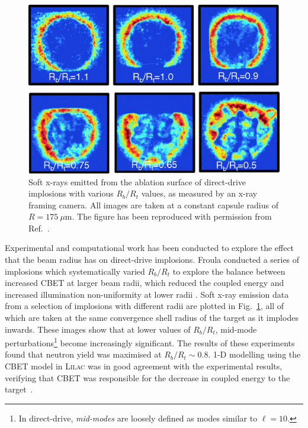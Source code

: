 \begin{figure}[t!]
    \includegraphics[width=0.5\linewidth]{Results1/Images/RbRt_froula.png}
    \centering
    \caption{Soft x-rays emitted from the ablation surface of direct-drive implosions with various $R_b/R_t$ values, as measured by an x-ray framing camera.
    All images are taken at a constant capsule radius of $R=175\ \mu\text{m}$.
    The figure has been reproduced with permission from Ref.~\cite{froula_increasing_2012}.}%
    \label{fig:RbRt_froula}
\end{figure}

Experimental and computational work has been conducted to explore the effect that the beam radius has on direct-drive implosions.
Froula  conducted a series of implosions which systematically varied $R_b/R_t$ to explore the balance between increased \ac{CBET} at larger beam radii, which reduced the coupled energy and increased illumination non-uniformity at lower radii \cite{froula_increasing_2012}.
Soft x-ray emission data from a selection of implosions with different radii are plotted in Fig.~\ref{fig:RbRt_froula}, all of which are taken at the same convergence shell radius of the target as it implodes inwards.
These images show that at lower values of $R_b/R_t$, mid-mode perturbations\footnote{In direct-drive, \textit{mid-modes} are loosely defined as modes similar to $\ell=10$.} become increasingly significant.
The results of these experiments found that neutron yield was maximised at $R_b/R_t\sim 0.8$.
1-D modelling using the \ac{CBET} model in \textsc{Lilac} was in good agreement with the experimental results, verifying that \ac{CBET} was responsible for the decrease in coupled energy to the target~\cite{igumenshchev_crossed-beam_2012}.

